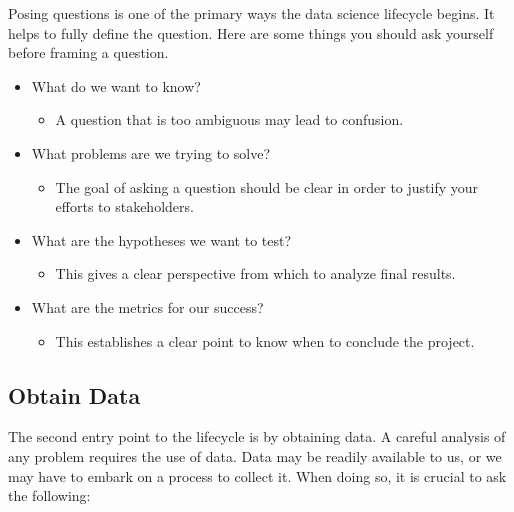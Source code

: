 \documentclass[
  letterpaper,
  DIV=11,
  numbers=noendperiod]{scrreprt}
\providecommand{\tightlist}{%
  \setlength{\itemsep}{0pt}\setlength{\parskip}{0pt}}\usepackage{longtable,booktabs,array}
\begin{document}
Posing questions is one of the primary ways the data science lifecycle
begins. It helps to fully define the question. Here are some things you
should ask yourself before framing a question.

\begin{itemize}
\tightlist
\item
  What do we want to know?

  \begin{itemize}
  \tightlist
  \item
    A question that is too ambiguous may lead to confusion.
  \end{itemize}
\item
  What problems are we trying to solve?

  \begin{itemize}
  \tightlist
  \item
    The goal of asking a question should be clear in order to justify
    your efforts to stakeholders.
  \end{itemize}
\item
  What are the hypotheses we want to test?

  \begin{itemize}
  \tightlist
  \item
    This gives a clear perspective from which to analyze final results.
  \end{itemize}
\item
  What are the metrics for our success?

  \begin{itemize}
  \tightlist
  \item
    This establishes a clear point to know when to conclude the project.
  \end{itemize}
\end{itemize}

\subsection{Obtain Data}\label{obtain-data}

The second entry point to the lifecycle is by obtaining data. A careful
analysis of any problem requires the use of data. Data may be readily
available to us, or we may have to embark on a process to collect it.
When doing so, it is crucial to ask the following:
\end{document}
